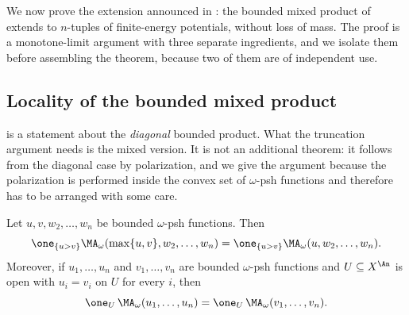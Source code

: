 We now prove the extension announced in
: the bounded mixed product of
 extends to \(n\)-tuples of finite-energy
potentials, without loss of mass.  The proof is a monotone-limit argument
with three separate ingredients, and we isolate them before assembling the
theorem, because two of them are of independent use.

\subsection{Locality of the bounded mixed product}
\label{sec:ch26-mixed-locality}

 is a statement about the \emph{diagonal}
bounded product.  What the truncation argument needs is the mixed version.
It is not an additional theorem: it follows from the diagonal case by
polarization, and we give the argument because the polarization is performed
inside the convex set of \(\omega\)-psh functions and therefore has to be
arranged with some care.

\begin{lemma}
\label{lem:ch26-mixed-locality}
Let \(u,v,w_2,\ldots,w_n\) be bounded \(\omega\)-psh functions.  Then
\begin{equation}
\label{eq:ch26-mixed-maximum-principle}
 \one_{\{u>v\}}\MA_\omega(\max\{u,v\},w_2,\ldots,w_n)
 =\one_{\{u>v\}}\MA_\omega(u,w_2,\ldots,w_n).
\end{equation}
Moreover, if \(u_1,\ldots,u_n\) and \(v_1,\ldots,v_n\) are bounded
\(\omega\)-psh functions and \(U\subseteq X^{\An}\) is open with
\(u_i=v_i\) on \(U\) for every \(i\), then
\begin{equation}
\label{eq:ch26-mixed-locality}
 \one_U\,\MA_\omega(u_1,\ldots,u_n)
 =\one_U\,\MA_\omega(v_1,\ldots,v_n).
\end{equation}
\end{lemma}

